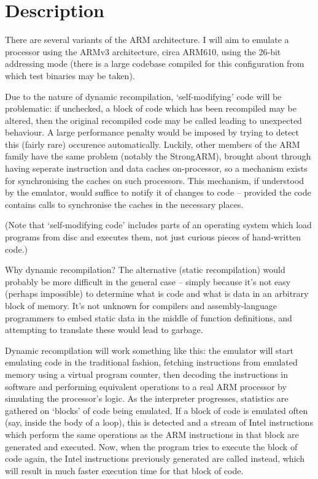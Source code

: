 \section*{Description}

There are several variants of the ARM architecture. I will aim to emulate a processor using the ARMv3 architecture, circa ARM610, using the 26-bit addressing mode (there is a large codebase compiled for this configuration from which test binaries may be taken).

Due to the nature of dynamic recompilation, `self-modifying' code will be problematic: if unchecked, a block of code which has been recompiled may be altered, then the original recompiled code may be called leading to unexpected behaviour. A large performance penalty would be imposed by trying to detect this (fairly rare) occurence automatically. Luckily, other members of the ARM family have the same problem (notably the StrongARM), brought about through having seperate instruction and data caches on-processor, so a mechanism exists for synchronising the caches on such processors. This mechanism, if understood by the emulator, would suffice to notify it of changes to code -- provided the code contains calls to synchronise the caches in the necessary places.

(Note that `self-modifying code' includes parts of an operating system which load programs from disc and executes them, not just curious pieces of hand-written code.)

Why dynamic recompilation? The alternative (static recompilation) would probably be more difficult in the general case -- simply because it's not easy (perhaps impossible) to determine what is code and what is data in an arbitrary block of memory. It's not unknown for compilers and assembly-language programmers to embed static data in the middle of function definitions, and attempting to translate these would lead to garbage.

Dynamic recompilation will work something like this: the emulator will start emulating code in the traditional fashion, fetching instructions from emulated memory using a virtual program counter, then decoding the instructions in software and performing equivalent operations to a real ARM processor by simulating the processor's logic. As the interpreter progresses, statistics are gathered on `blocks' of code being emulated. If a block of code is emulated often (say, inside the body of a loop), this is detected and a stream of Intel instructions which perform the same operations as the ARM instructions in that block are generated and executed. Now, when the program tries to execute the block of code again, the Intel instructions previously generated are called instead, which will result in much faster execution time for that block of code.


